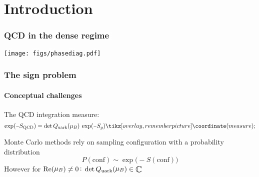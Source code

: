 \section{Introduction}
\frame[plain]{\sectionpage}
\addtocounter{framenumber}{-1}

\begin{frame}
  \frametitle{QCD in the dense regime}

  \vspace{.5em}

  \texttt{[image: figs/phasediag.pdf]}

\end{frame}

\begin{frame}
  \frametitle{The sign problem}
  \framesubtitle{Conceptual challenges}
  
  The QCD integration measure:
  \[
    \exp(\minus{}S_{\mathrm{QCD}}) = \det \qmat (\mu_B) \: \exp (\minus S_g) \tikzmark{measure}
  \]

  Monte Carlo methods rely on sampling configuration with a probability
  distribution
  \[
    P(\mathrm{conf}) \sim \exp\big(\minus{}S(\mathrm{conf})\big)
  \]
  However for \hskip5pt
  $\real (\raisebox{1pt}{$\mu_B$}) \neq 0 \,\raisebox{1pt}{$:$}$ \;%
  $\det \qmat(\raisebox{1pt}{$\mu_B$}) \in \raisebox{-1.5pt}{\scalebox{1.25}{$\mathbb{C}$}}$ 

\end{frame}


